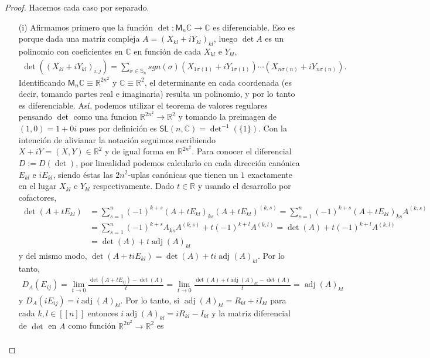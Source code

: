\documentclass[11pt]{article}
\newcommand{\R}{\mathbb{R}}
\newcommand{\C}{\mathbb{C}}
\newcommand{\M}[2]{\mathsf{M}_{#1}#2}
\newcommand{\nat}[1]{[\![#1]\!]}
\newcommand{\adj}[1]{\operatorname{adj}(#1)}
\begin{document}
\begin{proof} Hacemos cada caso por separado.
\begin{itemize} 
\item[(i)] Afirmamos primero que la funci\'on $\det : \M{n}{\C} \to \C$ es diferenciable. Eso es porque dada una matriz compleja $A = (X_{kl}+iY_{kl})_{kl}$, luego $\det A$ es un polinomio con coeficientes en $\C$ en funci\'on de cada $X_{kl}$ e $Y_{kl}$,
\begin{align*}
\det((X_{kl}+iY_{kl})_{i,j}) = \sum_{\sigma \in \mathbb{S}_n}sgn(\sigma)(X_{1\sigma(1)}+iY_{1\sigma(1)}) \cdots (X_{n \sigma(n)}+iY_{n\sigma(n)}).
\end{align*}
Identificando $\M{n}{\C} \equiv \R^{2n^2}$ y $\C \equiv \R^2$, el determinante en cada coordenada (es decir, tomando partes real e imaginaria) resulta un polinomio, y por lo tanto es diferenciable. As\'i, podemos utilizar el teorema de valores regulares pensando $\det$ como una funcion $\R^{2n^2} \to \R^2$ y tomando la preimagen de $(1,0) = 1+0i$ pues por definici\'on es $\mathsf{SL}(n,\C) = \det^{-1}(\{1\})$. Con la intenci\'on de alivianar la notaci\'on seguimos escribiendo $X+iY = (X,Y) \in \R^2$ y de igual forma en $\R^{2n^2}$. Para conocer el diferencial $D := D(\det)$, por linealidad podemos calcularlo en cada direcci\'on can\'onica $E_{kl}$ e $iE_{kl}$, siendo \'estas las $2n^2$-uplas can\'onicas que tienen un $1$ exactamente en el lugar $X_{kl}$ e $Y_{kl}$ respectivamente. Dado $t \in \R$ y usando el desarrollo por cofactores,
\begin{align*}
\det(A+tE_{kl}) &= \sum_{s=1}^n(-1)^{k+s}(A+tE_{kl})_{ks}(A+tE_{kl})^{(k,s)} = \sum_{s=1}^n(-1)^{k+s}(A+tE_{kl})_{ks}A^{(k,s)} \\ 
&= \sum_{s=1}^n(-1)^{k+s}A_{ks}A^{(k,s)} + t(-1)^{k+l}A^{(k,l)} = \det(A) + t(-1)^{k+l}A^{(k,l)}\\
& = \det(A) + t\adj{A}_{kl}
\end{align*}
y del mismo modo, $\det(A+tiE_{kl}) = \det(A) + ti\adj{A}_{kl}$. Por lo tanto,
\begin{align*}
D_A(E_{ij}) = \lim_{t \to 0} \frac{\det(A+tE_{ij}) - \det(A)}{t} = \lim_{t \to 0}\frac{\det(A)+t\adj{A}_{kl}-\det(A)}{t} = \adj{A}_{kl}
\end{align*}
y $D_A(iE_{ij}) = i\adj{A}_{kl}$. Por lo tanto, si $\adj{A}_{kl} = R_{kl} + iI_{kl}$ para cada $k,l \in \nat{n}$ entonces $i\adj{A}_{kl} = iR_{kl} - I_{kl}$ y la matriz diferencial de $\det$ en $A$ como funci\'on $\R^{2n^2} \to \R^2$ es
\begin{align*}

\end{align*}
\end{itemize}
\end{proof}
\end{document}
